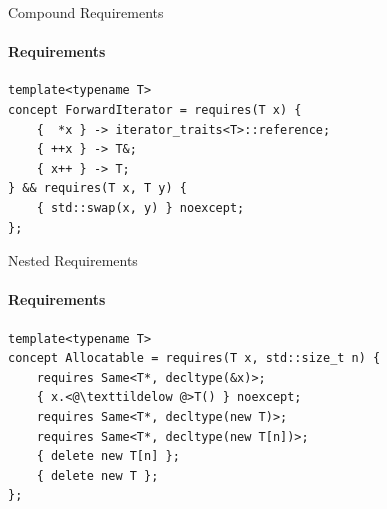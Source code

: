 \documentclass{beamer}
\begin{document}
    \begin{frame}[fragile]{Compound Requirements}
        \framesubtitle{Requirements}
        \begin{center}
        \begin{lstlisting}[caption={compound requirements found in an \texttt{ForwardIterator}.}]
template<typename T>
concept ForwardIterator = requires(T x) {
    {  *x } -> iterator_traits<T>::reference;
    { ++x } -> T&;
    { x++ } -> T;
} && requires(T x, T y) {
    { std::swap(x, y) } noexcept;
}; \end{lstlisting}
        \end{center}
    \end{frame}

    \begin{frame}[fragile]{Nested Requirements}
        \framesubtitle{Requirements}
        \begin{center}
        \begin{lstlisting}[caption={usage of nested requirement in an \texttt{Allocatable} concept.}]
template<typename T>
concept Allocatable = requires(T x, std::size_t n) {
    requires Same<T*, decltype(&x)>;
    { x.<@\texttildelow @>T() } noexcept;
    requires Same<T*, decltype(new T)>;
    requires Same<T*, decltype(new T[n])>;
    { delete new T[n] };
    { delete new T };
}; \end{lstlisting}
        \end{center}
    \end{frame}

\end{document}
